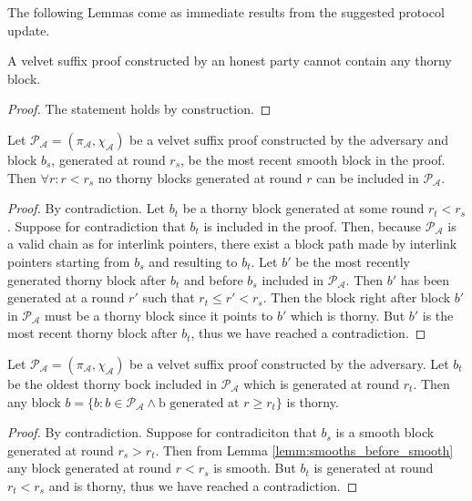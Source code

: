 The following Lemmas come as immediate results from the suggested protocol
update.

\begin{lemma}
	A velvet suffix proof constructed by an honest party cannot contain any thorny block.
	\label{lemm:smooth_honest_suffix}
\end{lemma}
\begin{proof}
	The statement holds by construction.
\end{proof}

\begin{lemma}
	Let $\mathcal{P_A} = (\pi_\mathcal{A}, \chi_\mathcal{A})$ be a velvet suffix proof constructed by the adversary and block $b_s$, generated at round $r_s$, be the most recent smooth block in the proof. Then $\forall r:r < r_s$ no thorny blocks generated at round $r$ can be included in $\mathcal{P_A}$.
	\label{lemm:smooths_before_smooth}
\end{lemma}
\begin{proof}
By contradiction. Let $b_t$ be a thorny block generated at some round $r_t < r_s$. Suppose for contradiction that $b_t$ is included in the proof. Then, because $\mathcal{P_A}$ is a valid chain as for interlink pointers, there exist a block path made by interlink pointers starting from $b_s$ and resulting to $b_t$. Let $b'$ be the most recently generated thorny block after $b_t$ and before $b_s$ included in $\mathcal{P_A}$. Then $b'$ has been generated at a round $r'$ such that $r_t \leq r' < r_s$. Then the block right after block $b'$ in $\mathcal{P_A}$ must be a thorny block since it points to $b'$ which is thorny. But $b'$ is the most recent thorny block after $b_t$, thus we have reached a contradiction.
\end{proof}

\begin{lemma}
	Let $\mathcal{P_A} = (\pi_\mathcal{A}, \chi_\mathcal{A})$ be a velvet suffix proof constructed by the adversary. Let $b_t$ be the oldest thorny bock included in $\mathcal{P_A}$ which is generated at round $r_t$. Then any block $b = \{b: b \in \mathcal{P_A} \wedge \text{b generated at }r \geq r_t \}$ is thorny.
	\label{lemm:thorny_after_thorny}
\end{lemma}
\begin{proof}
By contradiction. Suppose for contradiciton that $b_s$ is a smooth block generated at round $r_s > r_t$. Then from Lemma \ref{lemm:smooths_before_smooth} any block generated at round $r < r_s$ is smooth. But $b_t$ is generated at round $r_t < r_s$ and is thorny, thus we have reached a contradiction.
\end{proof}

